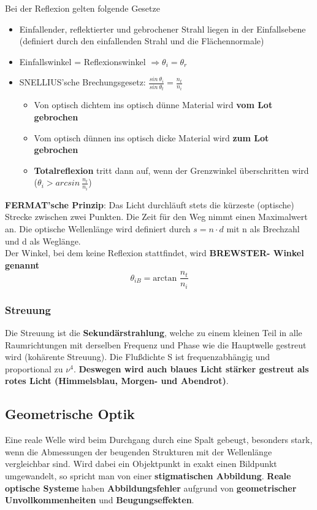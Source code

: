 \documentclass[12pt,a4paper,ngerman]{article}
\begin{document}
Bei der Reflexion gelten folgende Gesetze

\begin{itemize}
\item Einfallender, reflektierter und gebrochener Strahl liegen in der Einfallsebene (definiert durch den einfallenden Strahl und die Flächennormale)
\item Einfallswinkel = Reflexionswinkel $\Rightarrow \theta_i = \theta_r$
\item SNELLIUS'sche Brechungsgesetz: $\frac{sin \ \theta_i}{sin \ \theta_t} = \frac{n_t}{n_i}$
\begin{itemize}
\item Von optisch dichtem ins optisch dünne Material wird \textbf{vom Lot gebrochen}
\item Vom optisch dünnen ins optisch dicke Material wird \textbf{zum Lot gebrochen}
\item \textbf{Totalreflexion} tritt dann auf, wenn der Grenzwinkel überschritten wird \\($\theta_i > arcsin \ \frac{n_t}{n_i}$)
\end{itemize}
\end{itemize}
\textbf{FERMAT'sche Prinzip}: Das Licht durchläuft stets die kürzeste (optische) Strecke zwischen zwei Punkten. Die Zeit für den Weg nimmt einen Maximalwert an. Die optische Wellenlänge wird definiert durch $s = n \cdot d$ mit n als Brechzahl und d als Weglänge. \\
Der Winkel, bei dem keine Reflexion stattfindet, wird \textbf{BREWSTER- Winkel genannt}
\begin{equation}
\theta_{iB} = \text{arctan } \frac{n_t}{n_i}	
\end{equation}

\pagebreak

\subsubsection*{Streuung}
Die Streuung ist die \textbf{Sekundärstrahlung}, welche zu einem kleinen Teil in alle Raumrichtungen mit derselben Frequenz und Phase wie die Hauptwelle gestreut wird (kohärente Streuung). Die Flußdichte S ist frequenzabhängig und proportional zu $\nu^4$. \textbf{Deswegen wird auch blaues Licht stärker gestreut als rotes Licht (Himmelsblau, Morgen- und Abendrot)}.


\subsection{Geometrische Optik}
Eine reale Welle wird beim Durchgang durch eine Spalt gebeugt, besonders stark, wenn die Abmessungen der beugenden Strukturen mit der Wellenlänge vergleichbar sind. Wird dabei ein Objektpunkt in exakt einen Bildpunkt umgewandelt, so spricht man von einer \textbf{stigmatischen Abbildung}. \textbf{Reale optische Systeme} haben \textbf{Abbildungsfehler} aufgrund von \textbf{geometrischer Unvollkommenheiten} und \textbf{Beugungseffekten}. 
\end{document}

